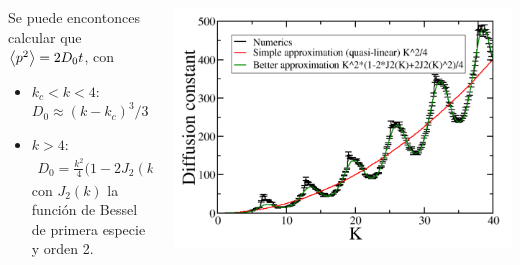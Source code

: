 \documentclass[aspectratio=169,xcolor=dvipsnames,7pt]{beamer}
\begin{document}
\begin{frame}
	\begin{columns}
		\begin{column}{0.55\textwidth}  %
			Se puede encontonces calcular que $\expval{p^2}=2D_0t$, con 
			\begin{itemize}
				\item $k_c<k<4$: $D_0 \approx (k - k_c)^3/3$
				\item $k>4$: 
				\begin{align*}
					D_0=\frac{k^2}{4}\Big(1 - 2J_2(k) + J_2^2(k)\Big),
				\end{align*}
				con $J_2(k)$ la función de Bessel de primera especie y orden 2.
			\end{itemize}
		\end{column}\hspace*{-5mm}
		\begin{column}{0.49\textwidth}
			\includegraphics[width=\textwidth]{D3}
		\end{column}
	\end{columns}
\end{frame}

\end{document}
